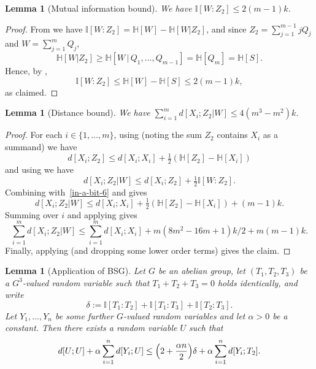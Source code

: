 \documentclass[10pt,a4paper]{article}
\newtheorem{lemma}[theorem]{Lemma}
\newcommand{\lean}[1]{}
\newcommand{\uses}[1]{}
\newcommand{\leanok}{}
\newcommand{\bbH}{\mathbb{H}}
\newcommand{\bbI}{\mathbb{I}}
\begin{document}
\begin{lemma}[Mutual information bound]\label{mutual-w-z2}\lean{mutual_of_W_Z_two_le}\leanok  We have  $\bbI[W : Z_2] \leq 2 (m-1) k$.
\end{lemma}

\begin{proof}\uses{alternative-mutual, ent-w}\leanok
  From  we have $\bbI[W : Z_2] = \bbH[W] - \bbH[W | Z_2]$, and since $Z_2 = \sum_{j=1}^{m-1} j Q_j$ and $W = \sum_{j=1}^m Q_j$,
  \[
    \bbH[W | Z_2] \geq \bbH[W \,|\, Q_1,\dots,Q_{m-1}] = \bbH[Q_m] = \bbH[S].
  \]
  Hence, by ,
  \[
    \bbI[W : Z_2] \leq \bbH[W] - \bbH[S] \leq 2 (m-1) k,
  \]
  as claimed.
\end{proof}

\begin{lemma}[Distance bound]\label{xi-z2-w-dist}\lean{sum_of_conditional_distance_le}\leanok We have $\sum_{i=1}^m d[X_i;Z_2|W] \leq 4(m^3-m^2) k$.
\end{lemma}

\begin{proof}\uses{klm-3, cond-dist-fact, mutual-w-z2, ent-z2, multidist-ruzsa-II}\leanok
  For each $i \in \{1,\dots, m\}$, using  (noting the sum $Z_2$ contains $X_i$ as a summand) we have
  \begin{equation}\label{in-a-bit-6}
    d[X_i;Z_2] \leq d[X_i;X_i] + \tfrac12 (\bbH[Z_2] - \bbH[X_i])
  \end{equation}
  and using  we have
  \[
    d[X_i;Z_2 | W] \leq d[X_i;Z_2] + \tfrac12 \bbI[W : Z_2].
  \]
 Combining with~\eqref{in-a-bit-6} and  gives
 \[ d[X_i;Z_2 | W] \leq d[X_i;X_i] + \tfrac12 (\bbH[Z_2] - \bbH[X_i]) + (m-1)k.\]
 Summing over $i$ and applying  gives
 \[ \sum_{i = 1}^m d[X_i;Z_2 | W] \leq \sum_{i = 1}^m d[X_i;X_i] + m(8m^2-16m+1) k/2 + m(m-1) k.\]
Finally, applying  (and dropping some lower order terms) gives the claim.
\end{proof}

\begin{lemma}[Application of BSG]
  \label{lem:get-better}\lean{dist_of_U_add_le}\leanok
  Let $G$ be an abelian group, let $(T_1,T_2,T_3)$ be a $G^3$-valued random variable such that $T_1+T_2+T_3=0$ holds identically, and write
  \[
    \delta := \bbI[T_1 : T_2] + \bbI[T_1 : T_3] + \bbI[T_2 : T_3].
  \]
  Let $Y_1,\dots,Y_n$ be some further $G$-valued random variables and let $\alpha>0$ be a constant.
  Then there exists a random variable $U$ such that
  \begin{equation}
    \label{eq:get-better}
    d[U;U] + \alpha \sum_{i=1}^n d[Y_i;U] \leq \Bigl(2 + \frac{\alpha n}{2} \Bigr) \delta + \alpha \sum_{i=1}^n d[Y_i;T_2].
  \end{equation}
\end{lemma}
\end{document}
